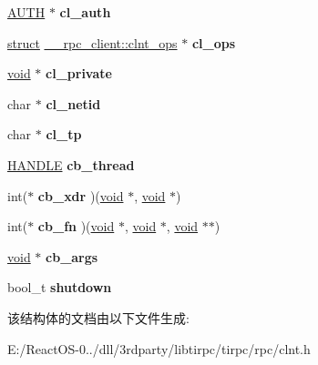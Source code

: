 \begin{DoxyCompactItemize}
\item 
\mbox{\label{struct____rpc__client_a22ee3470ee858391a12d98039a2b8b2b}} 
\hyperlink{struct____auth}{A\+U\+TH} $\ast$ {\bfseries cl\+\_\+auth}
\item 
\mbox{\label{struct____rpc__client_ada0ca0722bd9175ad78024a83450cb23}} 
\hyperlink{interfacestruct}{struct} \hyperlink{struct____rpc__client_1_1clnt__ops}{\+\_\+\+\_\+rpc\+\_\+client\+::clnt\+\_\+ops} $\ast$ {\bfseries cl\+\_\+ops}
\item 
\mbox{\label{struct____rpc__client_a1763fadec17d2fc35d379fbd64572547}} 
\hyperlink{interfacevoid}{void} $\ast$ {\bfseries cl\+\_\+private}
\item 
\mbox{\label{struct____rpc__client_aa410c646c517ccbd4a09be82475710ad}} 
char $\ast$ {\bfseries cl\+\_\+netid}
\item 
\mbox{\label{struct____rpc__client_a089a483871ac7e4d75fdb518ccd9aca1}} 
char $\ast$ {\bfseries cl\+\_\+tp}
\item 
\mbox{\label{struct____rpc__client_a47c1819013ca5b7dc1b10020be71b9a9}} 
\hyperlink{interfacevoid}{H\+A\+N\+D\+LE} {\bfseries cb\+\_\+thread}
\item 
\mbox{\label{struct____rpc__client_ab03813f07dec435f18c2c6eec3eaa5f1}} 
int($\ast$ {\bfseries cb\+\_\+xdr} )(\hyperlink{interfacevoid}{void} $\ast$, \hyperlink{interfacevoid}{void} $\ast$)
\item 
\mbox{\label{struct____rpc__client_a05c1e3917407990c3a50cb905aa46a39}} 
int($\ast$ {\bfseries cb\+\_\+fn} )(\hyperlink{interfacevoid}{void} $\ast$, \hyperlink{interfacevoid}{void} $\ast$, \hyperlink{interfacevoid}{void} $\ast$$\ast$)
\item 
\mbox{\label{struct____rpc__client_a646b28901b85ccb4cb32b301b682a202}} 
\hyperlink{interfacevoid}{void} $\ast$ {\bfseries cb\+\_\+args}
\item 
\mbox{\label{struct____rpc__client_a6d1d8e742ed8b3c3679f2c97600e5c5b}} 
bool\+\_\+t {\bfseries shutdown}
\end{DoxyCompactItemize}


该结构体的文档由以下文件生成\+:\begin{DoxyCompactItemize}
\item 
E\+:/\+React\+O\+S-\/0../dll/3rdparty/libtirpc/tirpc/rpc/clnt.\+h\end{DoxyCompactItemize}
